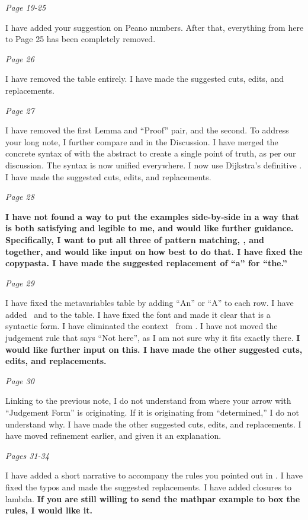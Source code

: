 \documentclass[manuscript,screen, 12pt, nonacm]{acmart}
\begin{document}
\it{Page 19-25}

I have added your suggestion on Peano numbers. After that, everything from here
to Page 25 has been completely removed. 

\it{Page 26} 

I have removed the table entirely. I have made the suggested cuts, edits, and
replacements. 

\it{Page 27} 

I have removed the first Lemma and “Proof” pair, and the second. To address your
long note, I further compare \VMinus and \VC in the Discussion. I have merged
the concrete syntax of \VMinus with the abstract to create a single point of
truth, as per our discussion. The syntax is now unified everywhere. I now use
Dijkstra's definitive \dbar. I have made the suggested cuts, edits, and
replacements. 

\it{Page 28} 

\bf{I have not found a way to put the examples side-by-side in a way that is both
satisfying and legible to me, and would like further guidance.} Specifically, I
want to put all three of pattern matching, \VC, and \VMinus together, and would
like input on how best to do that. I have fixed the copypasta. I have made the
suggested replacement of “a” for “the.”

\it{Page 29} 

I have fixed the metavariables table by adding “An” or “A” to each row. I have
added \Gs~and \gs to the table. I have fixed the font and made it clear that
\fail is a syntactic form. I have eliminated the context~\; from
\VMinus. I have not moved the judgement rule that says “Not here”, as I am not
sure why it fits exactly there. \bf{I would like further input on this.} I have made
the other suggested cuts, edits, and replacements. 

\it{Page 30} 

Linking to the previous note, I do not understand from where your arrow with
“Judgement Form” is originating. If it is originating from “determined,” I do
not understand why. I have made the other suggested cuts, edits, and
replacements. I have moved refinement earlier, and given it an explanation. 

\it{Pages 31-34} 

I have added a short narrative to accompany the rules you pointed out in
\VMinus. I have fixed the typos and made the suggested replacements. I have
added closures to lambda. \bf{If you are still willing to send the mathpar example
to box the rules, I would like it.}
\end{document}
